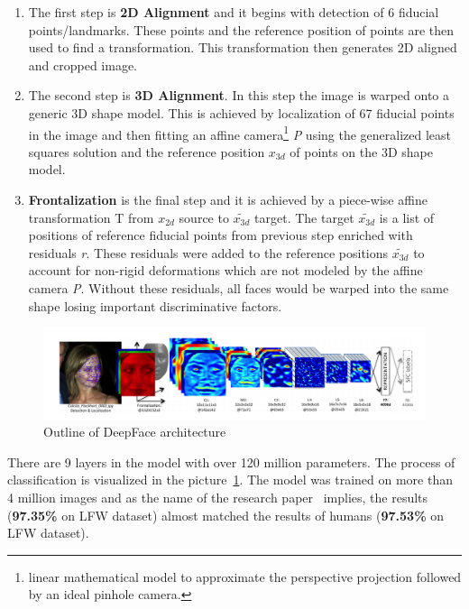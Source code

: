 \begin{enumerate}
    \item The first step is \textbf{2D Alignment} and it begins with detection of 6 fiducial points/landmarks.
    These points and the reference position of points are then used to find a transformation.
    This transformation then generates 2D aligned and cropped image.
    \item The second step is \textbf{3D Alignment}.
    In this step the image is warped onto a generic 3D shape model.
    This is achieved by localization of 67 fiducial points in the image and then fitting an affine
    camera\footnote{linear mathematical model to approximate the perspective projection followed by an ideal
    pinhole camera.} \textit{P} using the generalized least squares solution and the reference position $x_{3d}$ of
    points on the 3D shape model.
    \item \textbf{Frontalization} is the final step and it is achieved by a piece-wise affine transformation T from
    $x_{2d}$ source to $\tilde{x_{3d}}$ target.
    The target $\tilde{x_{3d}}$ is a list of positions of reference fiducial points from previous step enriched with
    residuals \textit{r}.
    These residuals were added to the reference positions $\tilde{x_{3d}}$ to account for non-rigid deformations which
    are not modeled by the affine camera \textit{P}.
    Without these residuals, all faces would be warped into the same shape losing important discriminative factors.
\end{enumerate}

\begin{figure}[H]
    \centering
    \includegraphics[width=\columnwidth]{images/face-recognition/deepface.png}
    \caption{Outline of DeepFace architecture~\cite{DeepFace}}
    \label{fig:deepface}
\end{figure}

There are 9 layers in the model with over 120 million parameters.
The process of classification is visualized in the picture~\ref{fig:deepface}.
The model was trained on more than 4 million images and as the name of the research paper~\cite{DeepFace} implies, the
results (\textbf{97.35\%} on LFW dataset) almost matched the results of humans (\textbf{97.53\%} on LFW dataset).


